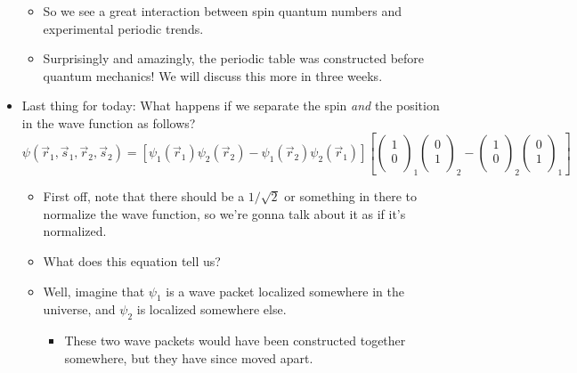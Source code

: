 \documentclass[../notes.tex]{subfiles}
\begin{document}
\begin{itemize}
\begin{itemize}
        \item So we see a great interaction between spin quantum numbers and experimental periodic trends.
        \item Surprisingly and amazingly, the periodic table was constructed before quantum mechanics! We will discuss this more in three weeks.
    \end{itemize}
    \item Last thing for today: What happens if we separate the spin \emph{and} the position in the wave function as follows?
    \begin{equation*}
        \psi(\vec{r}_1,\vec{s}_1,\vec{r}_2,\vec{s}_2) = \left[ \psi_1(\vec{r}_1)\psi_2(\vec{r}_2)-\psi_1(\vec{r}_2)\psi_2(\vec{r}_1) \right]\left[
            \begin{pmatrix}
                1\\
                0\\
            \end{pmatrix}_1
            \begin{pmatrix}
                0\\
                1\\
            \end{pmatrix}_2
            -
            \begin{pmatrix}
                1\\
                0\\
            \end{pmatrix}_2
            \begin{pmatrix}
                0\\
                1\\
            \end{pmatrix}_1
        \right]
    \end{equation*}
    \begin{itemize}
        \item First off, note that there should be a $1/\sqrt{2}$ or something in there to normalize the wave function, so we're gonna talk about it as if it's normalized.
        \item What does this equation tell us?
        \item Well, imagine that $\psi_1$ is a wave packet localized somewhere in the universe, and $\psi_2$ is localized somewhere else.
        \begin{itemize}
            \item These two wave packets would have been constructed together somewhere, but they have since moved apart.

\end{itemize}
\end{itemize}
\end{itemize}
\end{document}
